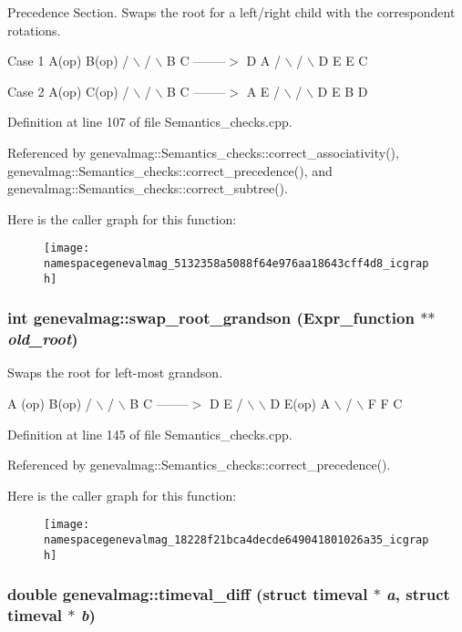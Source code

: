 Precedence Section. Swaps the root for a left/right child with the correspondent rotations.

Case 1 A(op) B(op) / $\backslash$ / $\backslash$ B C --------$>$ D A / $\backslash$ / $\backslash$ D E E C

Case 2 A(op) C(op) / $\backslash$ / $\backslash$ B C --------$>$ A E / $\backslash$ / $\backslash$ D E B D 

Definition at line 107 of file Semantics\_\-checks.cpp.

Referenced by genevalmag::Semantics\_\-checks::correct\_\-associativity(), genevalmag::Semantics\_\-checks::correct\_\-precedence(), and genevalmag::Semantics\_\-checks::correct\_\-subtree().

Here is the caller graph for this function:\nopagebreak
\begin{figure}[H]
\begin{center}
\leavevmode
\texttt{[image: namespacegenevalmag\_5132358a5088f64e976aa18643cff4d8\_icgraph]}
\end{center}
\end{figure}
\hypertarget{namespacegenevalmag_18228f21bca4decde649041801026a35}{
\subsubsection[{swap\_\-root\_\-grandson}]{\setlength{\rightskip}{0pt plus 5cm}int genevalmag::swap\_\-root\_\-grandson (Expr\_\-function $\ast$$\ast$ {\em old\_\-root})}}
\label{namespacegenevalmag_18228f21bca4decde649041801026a35}


Swaps the root for left-most grandson.

A (op) B(op) / $\backslash$ / $\backslash$ B C --------$>$ D E / $\backslash$ $\backslash$ D E(op) A $\backslash$ / $\backslash$ F F C 

Definition at line 145 of file Semantics\_\-checks.cpp.

Referenced by genevalmag::Semantics\_\-checks::correct\_\-precedence().

Here is the caller graph for this function:\nopagebreak
\begin{figure}[H]
\begin{center}
\leavevmode
\texttt{[image: namespacegenevalmag\_18228f21bca4decde649041801026a35\_icgraph]}
\end{center}
\end{figure}
\hypertarget{namespacegenevalmag_885d7859db4dd91f78bb7081be6ceacb}{
\subsubsection[{timeval\_\-diff}]{\setlength{\rightskip}{0pt plus 5cm}double genevalmag::timeval\_\-diff (struct timeval $\ast$ {\em a}, \/  struct timeval $\ast$ {\em b})}}
\label{namespacegenevalmag_885d7859db4dd91f78bb7081be6ceacb}




